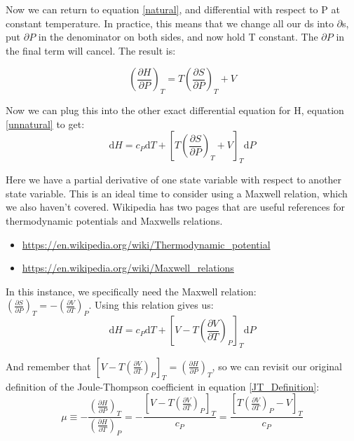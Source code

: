 \documentclass[12pt,letterpaper]{article}
\begin{document}
	Now we can return to equation \ref{natural}, and differential with respect to P at constant temperature. In practice, this means that we change all our $\mathrm{d}$s into $\partial$s, put $\partial P$ in the denominator on both sides, and now hold T constant. The $\partial P$ in the final term will cancel. The result is:
	
	\begin{equation}
		\left(\frac{\partial H}{\partial P}\right)_T = T \left(\frac{\partial S}{\partial P}\right)_T + V
	\end{equation}

	Now we can plug this into the other exact differential equation for H, equation \ref{unnatural} to get:
	\begin{equation}
		\mathrm{d}H=c_P\mathrm{d}T + \left[T \left(\frac{\partial S}{\partial P}\right)_T + V\right]_T\mathrm{d}P
	\end{equation}

	Here we have a partial derivative of one state variable with respect to another state variable. This is an ideal time to consider using a Maxwell relation, which we also haven't covered. Wikipedia has two pages that are useful references for thermodynamic potentials and Maxwells relations.
	\begin{itemize}
		\item \href{https://en.wikipedia.org/wiki/Thermodynamic_potential}{https://en.wikipedia.org/wiki/Thermodynamic\_potential}
		\item \href{https://en.wikipedia.org/wiki/Maxwell_relations}{https://en.wikipedia.org/wiki/Maxwell\_relations}
	\end{itemize}

	In this instance, we specifically need the Maxwell relation:\\ $\left(\frac{\partial S}{\partial P}\right)_T = - \left(\frac{\partial V}{\partial T}\right)_P$. Using this relation gives us:
	\begin{equation}
		\mathrm{d}H=c_P\mathrm{d}T + \left[V-T \left(\frac{\partial V}{\partial T}\right)_P\right]_T\mathrm{d}P
	\end{equation}

	And remember that $\left[V-T \left(\frac{\partial V}{\partial T}\right)_P\right]_T=\left(\frac{\partial H}{\partial P}\right)_T$, so we can revisit our original definition of the Joule-Thompson coefficient in equation \ref{JT_Definition}:
	\begin{equation}
		\mu\equiv-\frac{\left(\frac{\partial H}{\partial P}\right)_T}{\left(\frac{\partial H}{\partial T}\right)_P} = -\frac{\left[V-T \left(\frac{\partial V}{\partial T}\right)_P\right]_T}{c_P} = \frac{\left[T \left(\frac{\partial V}{\partial T}\right)_P-V\right]_T}{c_P}
	\end{equation}
\end{document}
